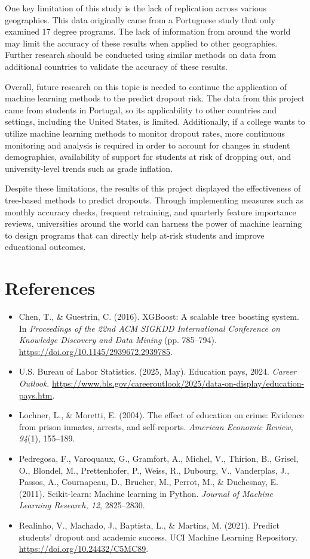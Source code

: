 \documentclass[11pt]{article}
\begin{document}
One key limitation of this study is the lack of replication across various geographies. This data originally came from a Portuguese study that only examined 17 degree programs. The lack of information from around the world may limit the accuracy of these results when applied to other geographies. Further research should be conducted using similar methods on data from additional countries to validate the accuracy of these results.

Overall, future research on this topic is needed to continue the application of machine learning methods to the predict dropout risk. The data from this project came from students in Portugal, so its applicability to other countries and settings, including the United States, is limited. Additionally, if a college wants to utilize machine learning methods to monitor dropout rates, more continuous monitoring and analysis is required in order to account for changes in student demographics, availability of support for students at risk of dropping out, and university-level trends such as grade inflation. 

Despite these limitations, the results of this project displayed the effectiveness of tree-based methods to predict dropouts. Through implementing measures such as monthly accuracy checks, frequent retraining, and quarterly feature importance reviews, universities around the world can harness the power of machine learning to design programs that can directly help at-risk students and improve educational outcomes. 

\newpage
\section{References}
\begin{itemize}
    \item Chen, T., \& Guestrin, C. (2016). XGBoost: A scalable tree boosting system. In \textit{Proceedings of the 22nd ACM SIGKDD International Conference on Knowledge Discovery and Data Mining} (pp. 785--794). \url{https://doi.org/10.1145/2939672.2939785}.
    \item U.S. Bureau of Labor Statistics. (2025, May). Education pays, 2024. \textit{Career Outlook}. \url{https://www.bls.gov/careeroutlook/2025/data-on-display/education-pays.htm}.
    \item Lochner, L., \& Moretti, E. (2004). The effect of education on crime: Evidence from prison inmates, arrests, and self-reports. \textit{American Economic Review, 94}(1), 155--189.
    \item Pedregosa, F., Varoquaux, G., Gramfort, A., Michel, V., Thirion, B., Grisel, O., Blondel, M., Prettenhofer, P., Weiss, R., Dubourg, V., Vanderplas, J., Passos, A., Cournapeau, D., Brucher, M., Perrot, M., \& Duchesnay, E. (2011). Scikit-learn: Machine learning in Python. \textit{Journal of Machine Learning Research, 12}, 2825--2830.
    \item Realinho, V., Machado, J., Baptista, L., \& Martins, M. (2021). Predict students' dropout and academic success. UCI Machine Learning Repository. \url{https://doi.org/10.24432/C5MC89}.
\end{itemize}
\end{document}
